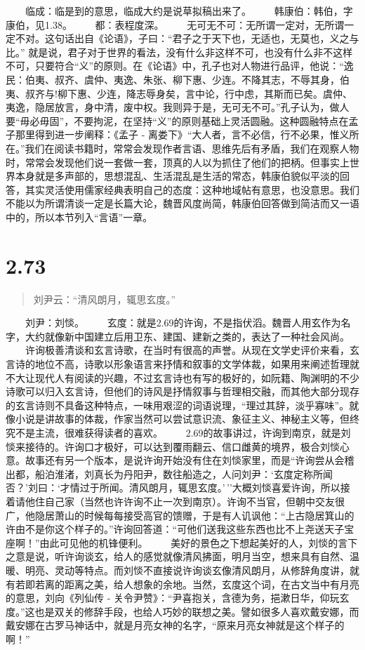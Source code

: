 \documentclass[]{book}
\begin{document}
　　临成：临是到的意思，临成大约是说草拟稿出来了。
　　韩康伯：韩伯，字康伯，见1.38。 　　都：表程度深。
　　无可无不可：无所谓一定对，无所谓一定不对。这句话出自《论语》，子曰：``君子之于天下也，无适也，无莫也，义之与比。''
就是说，君子对于世界的看法，没有什么非这样不可，也没有什么非不这样不可，只要符合``义''的原则。在《论语》中，孔子也对人物进行品评，他说：``逸民：伯夷、叔齐、虞仲、夷逸、朱张、柳下惠、少连。不降其志，不辱其身，伯夷、叔齐与!柳下惠、少连，降志辱身矣，言中论，行中虑，其斯而已矣。虞仲、夷逸，隐居放言，身中清，废中权。我则异于是，无可无不可。''孔子认为，做人要``毋必毋固''，不要拘泥，在坚持``义''的原则基础上灵活圆融。这种圆融特点在孟子那里得到进一步阐释：《孟子
-
离娄下》``大人者，言不必信，行不必果，惟义所在。''我们在阅读书籍时，常常会发现作者言语、思维先后有矛盾，我们在观察人物时，常常会发现他们说一套做一套，顶真的人以为抓住了他们的把柄。但事实上世界本身就是多声部的，思想混乱、生活混乱是生活的常态，韩康伯貌似平淡的回答，其实灵活使用儒家经典表明自己的态度：这种地域帖有意思，也没意思。我们不能以为所谓清谈一定是长篇大论，魏晋风度尚简，韩康伯回答做到简洁而又一语中的，所以本节列入``言语''一章。

\section{2.73}\label{section-119}

\begin{quote}
刘尹云：``清风朗月，辄思玄度。''
\end{quote}

　　刘尹：刘惔。
　　玄度：就是2.69的许询，不是指伏滔。魏晋人用玄作为名字，大约就像新中国建立后用卫东、建国、建新之类的，表达了一种社会风尚。
　　许询极善清谈和玄言诗歌，在当时有很高的声誉。从现在文学史评价来看，玄言诗的地位不高，诗歌以形象语言来抒情和叙事的文学体裁，如果用来阐述哲理就不大让现代人有阅读的兴趣，不过玄言诗也有写的极好的，如阮籍、陶渊明的不少诗歌可以归入玄言诗，但他们的诗风是抒情叙事与哲理相交融，而其他大部分现存的玄言诗则不具备这种特点，一味用艰涩的词语说理，``理过其辞，淡乎寡味''。就像小说是讲故事的体裁，作家当然可以尝试意识流、象征主义、神秘主义等，但终究不是主流，很难获得读者的喜欢。
　　2.69的故事讲过，许询到南京，就是刘惔来接待的。许询口才极好，可以达到覆雨翻云、信口雌黄的境界，极合刘惔心意。故事还有另一个版本，是说许询开始没有住在刘惔家里，而是``许询尝从会稽出都，船泊淮渚，刘真长为丹阳尹，数往船造之，人问刘尹：`玄度定称所闻否？'刘曰：`才情过于所闻。清风朗月，辄思玄度。'\,''大概刘惔喜爱许询，所以接着请他住自己家（当然也许许询不止一次到南京）。许询不当官，但朝中交友很广，他隐居萧山的时候每每接受高官的馈赠，于是有人讥讽他：``上古隐居箕山的许由不是你这个样子的。''许询回答道：``可他们送我这些东西也比不上尧送天子宝座啊！''由此可见他的机锋便利。
　　美好的景色之下想起美好的人，刘惔的言下之意是说，听许询谈玄，给人的感觉就像清风拂面，明月当空，想来具有自然、温暖、明亮、灵动等特点。而刘惔不直接说许询谈玄像清风朗月，从修辞角度讲，就有若即若离的距离之美，给人想象的余地。当然，玄度这个词，在古文当中有月亮的意思，刘向《列仙传
-
关令尹赞》：``尹喜抱关，含德为务，挹漱日华，仰玩玄度。''这也是双关的修辞手段，也给人巧妙的联想之美。譬如很多人喜欢戴安娜，而戴安娜在古罗马神话中，就是月亮女神的名字，``原来月亮女神就是这个样子的啊！''　　　　
\end{document}
